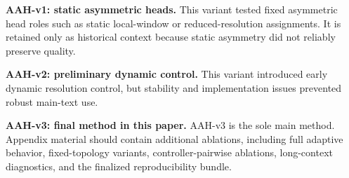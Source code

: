 \documentclass[11pt]{article}
\begin{document}
\textbf{AAH-v1: static asymmetric heads.} This variant tested fixed asymmetric head roles such as static local-window or reduced-resolution assignments. It is retained only as historical context because static asymmetry did not reliably preserve quality.

\textbf{AAH-v2: preliminary dynamic control.} This variant introduced early dynamic resolution control, but stability and implementation issues prevented robust main-text use.

\textbf{AAH-v3: final method in this paper.} AAH-v3 is the sole main method. Appendix material should contain additional ablations, including full adaptive behavior, fixed-topology variants, controller-pairwise ablations, long-context diagnostics, and the finalized reproducibility bundle.
\end{document}
